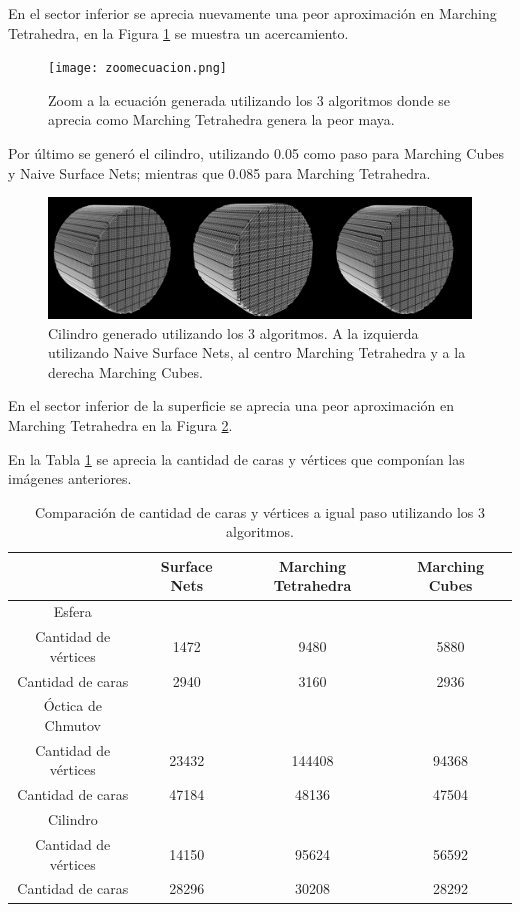 \documentclass[12pt]{article}
\begin{document}
En el sector inferior se aprecia nuevamente una peor aproximación en Marching Tetrahedra, en la Figura \ref{ecuacion22GZ} se muestra un acercamiento.

\begin{figure}[h!]
\texttt{[image: zoomecuacion.png]}
\caption{Zoom a la ecuación generada utilizando los 3 algoritmos donde se aprecia como Marching Tetrahedra genera la peor maya.}
\label{ecuacion22GZ}
\end{figure}

Por último se generó el cilindro, utilizando 0.05 como paso para Marching Cubes y Naive Surface Nets; mientras que 0.085 para Marching Tetrahedra.

\begin{figure}[h!]
\includegraphics[width=\linewidth,center]{cilindro2.png}
\caption{Cilindro generado utilizando los 3 algoritmos.  A la izquierda utilizando Naive Surface Nets, al centro Marching Tetrahedra y a la derecha Marching Cubes.}
  \label{cilindro2G}
\end{figure}

En el sector inferior de la superficie se aprecia una peor aproximación en Marching Tetrahedra en la Figura \ref{cilindro2G}.

En la Tabla \ref{cii} se aprecia la cantidad de caras y vértices que componían las imágenes anteriores.

\begin{table}[h!]
  \centering
  \begin{tabular}{cccc}
    \toprule
    & Surface Nets & Marching Tetrahedra & Marching Cubes\\
    \midrule
    Esfera&&&\\
    Cantidad de vértices & 1472 & 9480  & 5880 \\
    Cantidad de caras &  2940 & 3160 & 2936 \\
\hline
     Óctica de Chmutov&&&\\
    Cantidad de vértices & 23432 & 144408  & 94368 \\
    Cantidad de caras &  47184 & 48136 & 47504 \\
\hline
     Cilindro&&&\\
    Cantidad de vértices & 14150 &  95624 & 56592 \\
    Cantidad de caras &  28296 & 30208 & 28292 \\
\bottomrule
  \end{tabular}
  \caption{Comparación de cantidad de caras y vértices a igual paso utilizando los 3 algoritmos.}
  \label{cii}
\end{table}
\end{document}

